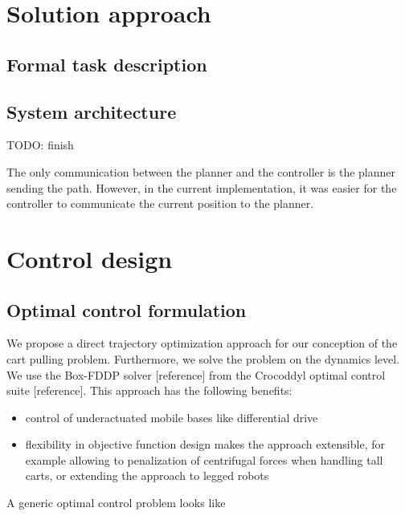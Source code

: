 \documentclass{article}
\begin{document}
\section{Solution approach}
\label{sec-solution-approach}

\subsection{Formal task description}
\subsection{System architecture}
TODO: finish

The only communication between the planner and the controller is 
the planner sending the path. 
However, in the current implementation, 
it was easier for the controller to communicate 
the current position to the planner.

\section{Control design}
\subsection{Optimal control formulation}
We propose a direct trajectory optimization approach for our conception
of the cart pulling problem. Furthermore, we solve the problem
on the dynamics level. We use the Box-FDDP solver [reference]
from the Crocoddyl optimal control suite [reference].
This approach has the following benefits:
\begin{itemize}
\item control of underactuated mobile bases like differential drive
\item flexibility in objective function design 
makes the approach extensible, for example allowing to penalization of centrifugal 
forces when handling tall carts, or extending the approach to legged robots
\end{itemize}

A generic optimal control problem looks like
\end{document}
